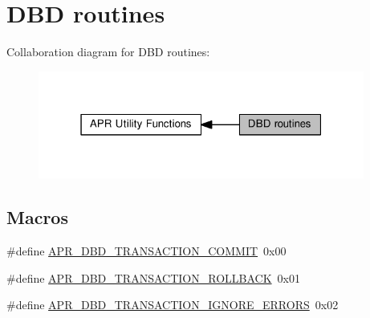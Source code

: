 \hypertarget{group__APR__Util__DBD}{}\section{D\+BD routines}
\label{group__APR__Util__DBD}
Collaboration diagram for D\+BD routines\+:
\nopagebreak
\begin{figure}[H]
\begin{center}
\leavevmode
\includegraphics[width=304pt]{group__APR__Util__DBD}
\end{center}
\end{figure}
\subsection*{Macros}
\begin{DoxyCompactItemize}
\item 
\#define \hyperlink{group__APR__Util__DBD_gaff6a26fb3b384bcb3a9172676c53590b}{A\+P\+R\+\_\+\+D\+B\+D\+\_\+\+T\+R\+A\+N\+S\+A\+C\+T\+I\+O\+N\+\_\+\+C\+O\+M\+M\+IT}~0x00
\item 
\#define \hyperlink{group__APR__Util__DBD_ga60a8749e5172b692fd2e356b48ec922b}{A\+P\+R\+\_\+\+D\+B\+D\+\_\+\+T\+R\+A\+N\+S\+A\+C\+T\+I\+O\+N\+\_\+\+R\+O\+L\+L\+B\+A\+CK}~0x01
\item 
\#define \hyperlink{group__APR__Util__DBD_gad9dc523b0a3b8dea5b8c9b7b0c281ea2}{A\+P\+R\+\_\+\+D\+B\+D\+\_\+\+T\+R\+A\+N\+S\+A\+C\+T\+I\+O\+N\+\_\+\+I\+G\+N\+O\+R\+E\+\_\+\+E\+R\+R\+O\+RS}~0x02
\end{DoxyCompactItemize}
